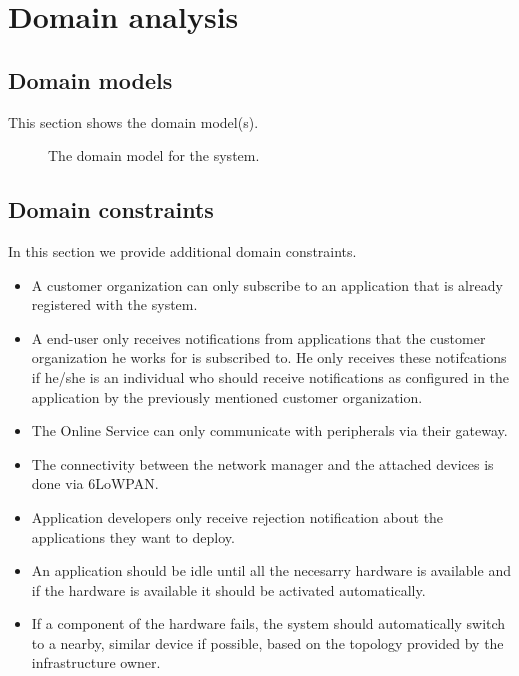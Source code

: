 \documentclass[english]{sareport}
\begin{document}
\maketitle

\tableofcontents

\chapter{Domain analysis}\label{sec:domain}
\section{Domain models}
This section shows the domain model(s).

\begin{figure}[!htp]
    \centering
    \caption{The domain model for the system.}\label{fig:domain_model}
\end{figure}

\section{Domain constraints}
In this section we provide additional domain constraints.

\begin{itemize}
    \item A customer organization can only subscribe to an application that is already registered with the system.
    \item A end-user only receives notifications from applications that the customer organization he works for is subscribed to. He only receives these notifcations if he/she is an individual who should receive notifications as configured in the application by the previously mentioned customer organization.
    \item The Online Service can only communicate with peripherals via their gateway.
    \item The connectivity between the network manager and the attached devices is done via 6LoWPAN.
    \item Application developers only receive rejection notification about the applications they want to deploy.
    \item An application should be idle until all the necesarry hardware is available and if the hardware is available it should be activated automatically.
    \item If a component of the hardware fails, the system should automatically switch to a nearby, similar device if possible, based on the topology provided by the infrastructure owner.
\end{itemize}
\end{document}
